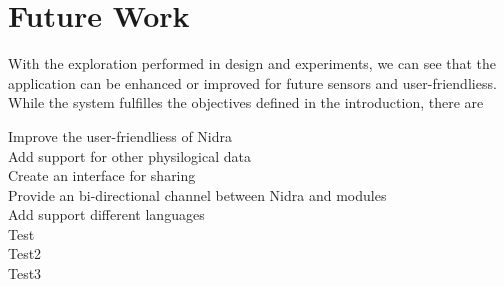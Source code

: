 \section{Future Work}
With the exploration performed in design and experiments, we can see that the application can be enhanced or improved for future sensors and user-friendliess. While the system fulfilles the objectives defined in the introduction, there are 

\begin{description}
    \item[Improve the user-friendliess of Nidra]
    \item[Add support for other physilogical data] 
    \item[Create an interface for sharing]
    \item[Provide an bi-directional channel between Nidra and modules]
    \item[Add support different languages] 
    \item[Test]
    \item[Test2]
    \item[Test3] 
\end{description}